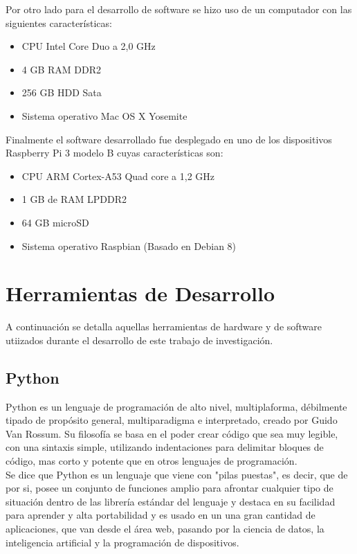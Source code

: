 Por otro lado para el desarrollo de software se hizo uso de un computador con las siguientes características:
\begin{itemize}
\item CPU Intel Core Duo a 2,0 GHz
\item 4 GB RAM DDR2
\item 256 GB HDD Sata
\item Sistema operativo Mac OS X Yosemite
\end{itemize}

Finalmente el software desarrollado fue desplegado en uno de los dispositivos Raspberry Pi 3 modelo B cuyas características son:
\begin{itemize}
\item CPU ARM Cortex-A53 Quad core a 1,2 GHz
\item 1 GB de RAM LPDDR2
\item 64 GB microSD 
\item Sistema operativo Raspbian (Basado en Debian 8) 
\end{itemize}

\section{Herramientas de Desarrollo}
A continuación se detalla aquellas herramientas de hardware y de software utiizados durante el desarrollo de este trabajo de investigación.

\subsection{Python}
Python es un lenguaje de programación de alto nivel, multiplaforma,  débilmente tipado de propósito general, multiparadigma e interpretado\cite{whatspython}, creado por Guido Van Rossum. Su filosofía se basa en el poder crear código que sea muy legible, con una sintaxis simple, utilizando indentaciones para delimitar bloques de código, mas corto y potente que en otros lenguajes de programación.\cite{Guido}\\

Se dice que Python es un lenguaje que viene con "pilas puestas"\cite{pep206}, es decir, que de por si, posee un conjunto de funciones amplio para afrontar cualquier tipo de situación dentro de las librería estándar del lenguaje y destaca en su facilidad para aprender y alta portabilidad y es usado en un una gran cantidad de aplicaciones, que van desde el área web, pasando por la ciencia de datos, la inteligencia artificial y la programación de dispositivos. 

